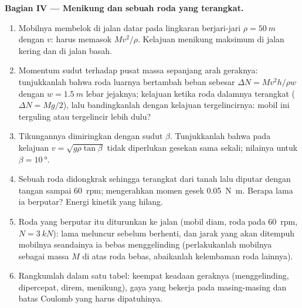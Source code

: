\begin{problem}
\medskip
\noindent\textbf{Bagian IV --- Menikung dan sebuah roda yang terangkat.}
\begin{enumerate}[resume]
  \item Mobilnya membelok di jalan datar pada lingkaran berjari-jari
        $\rho = \qty{50}{m}$ dengan $v$:  harus
        memasok $Mv^2/\rho$. Kelajuan menikung maksimum di jalan kering
        dan di jalan basah.
  \item Momentum sudut terhadap pusat massa sepanjang arah geraknya:
        tunjukkanlah bahwa roda luarnya bertambah beban sebesar
        $\Delta N =
        Mv^2h/\rho w$ dengan $w = \qty{1.5}{m}$ lebar jejaknya;
        kelajuan ketika roda dalamnya terangkat ($\Delta N = Mg/2$),
        lalu bandingkanlah dengan kelajuan tergelincirnya: mobil ini
        terguling atau tergelincir lebih dulu?
  \item Tikungannya dimiringkan dengan sudut $\beta$. Tunjukkanlah
        bahwa pada kelajuan $v = \sqrt{g\rho\tan\beta}$ tidak
        diperlukan gesekan sama sekali; nilainya untuk
        $\beta = \qty{10}{\degree}$.
  \item Sebuah roda didongkrak sehingga terangkat dari tanah lalu
        diputar dengan tangan sampai \qty{60}{rpm}; 
        mengerahkan momen gesek \qty{0.05}{N.m}. Berapa lama ia
        berputar? Energi kinetik yang hilang.
  \item Roda yang berputar itu diturunkan ke jalan (mobil diam, roda
        pada \qty{60}{rpm}, $N = \qty{3}{kN}$): lama meluncur sebelum
        berhenti, dan jarak yang akan ditempuh mobilnya seandainya ia
        bebas menggelinding (perlakukanlah mobilnya sebagai massa $M$
        di atas roda bebas, abaikanlah kelembaman roda lainnya).
  \item Rangkumlah dalam satu tabel: keempat keadaan geraknya
        (menggelinding, dipercepat, direm, menikung), gaya yang bekerja
        pada masing-masing dan batas Coulomb yang harus dipatuhinya.
\end{enumerate}
\end{problem}
